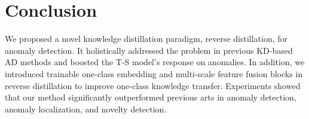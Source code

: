 \documentclass[10pt,twocolumn,letterpaper]{article}
\begin{document}
\section{Conclusion}

We proposed a novel knowledge distillation paradigm, reverse distillation, for anomaly detection. It holistically addressed the problem in previous KD-based AD methods and boosted the T-S model's response on anomalies. In addition, we introduced trainable one-class embedding and multi-scale feature fusion blocks in reverse distillation to improve one-class knowledge transfer. Experiments showed that our method significantly outperformed previous arts in anomaly detection, anomaly localization, and novelty detection.

{\small


}
\end{document}
